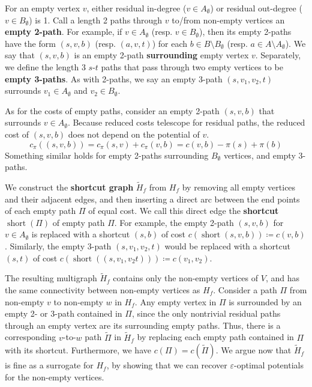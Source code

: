 \documentclass[11pt]{article}
\def\eps{\varepsilon}
\def\short{\operatorname{short}}
\theoremstyle{plain}
\numberwithin{figure}{section}
\def\EMPH#1{\textbf{\boldmath #1}}
\begin{document}
For an empty vertex $v$, either residual in-degree ($v \in A_\emptyset$) or
residual out-degree ($v \in B_\emptyset$) is 1.
Call a length 2 paths through $v$ to/from non-empty vertices an
\EMPH{empty 2-path}.
For example, if $v \in A_\emptyset$ (resp. $v \in B_\emptyset$), then its empty
2-paths have the form $(s, v, b)$ (resp. $(a, v, t)$) for each
$b \in B \setminus B_\emptyset$ (resp. $a \in A \setminus A_\emptyset$).
We say that $(s, v, b)$ is an empty 2-path \EMPH{surrounding} empty vertex $v$.
Separately, we define the length 3 $s$-$t$ paths that pass through two empty
vertices to be \EMPH{empty 3-paths}.
As with 2-paths, we say an empty 3-path $(s, v_1, v_2, t)$ surrounds
$v_1 \in A_\emptyset$ and $v_2 \in B_\emptyset$.

As for the costs of empty paths, consider an empty 2-path $(s, v, b)$ that
surrounds $v \in A_\emptyset$.
Because reduced costs telescope for residual paths, the reduced cost of
$(s, v, b)$ does not depend on the potential of $v$.
\begin{equation*}
	c_\pi((s, v, b)) = c_\pi(s, v) + c_\pi(v, b) = c(v, b) - \pi(s) + \pi(b)
\end{equation*}
Something similar holds for empty 2-paths surrounding $B_\emptyset$ vertices,
and empty 3-paths.

We construct the \EMPH{shortcut graph} $\tilde{H}_f$ from $H_f$ by removing all
empty vertices and their adjacent edges, and then inserting a direct arc
between the end points of each empty path $\Pi$ of equal cost.
We call this direct edge the \EMPH{shortcut} $\short(\Pi)$ of empty path $\Pi$.
For example, the empty 2-path $(s, v, b)$ for $v \in A_\emptyset$ is replaced
with a shortcut $(s, b)$ of cost $c(\short(s, v, b)) \coloneqq c(v, b)$.
Similarly, the empty 3-path $(s, v_1, v_2, t)$ would be replaced with a
shortcut $(s, t)$ of cost $c(\short((s, v_1, v_2 t))) \coloneqq c(v_1, v_2)$.

The resulting multigraph $\tilde{H}_f$ contains only the non-empty vertices of
$V$, and has the same connectivity between non-empty vertices as $H_f$.
Consider a path $\Pi$ from non-empty $v$ to non-empty $w$ in $H_f$.
Any empty vertex in $\Pi$ is surrounded by an empty 2- or 3-path contained
in $\Pi$, since the only nontrivial residual paths through an empty vertex are
its surrounding empty paths.
Thus, there is a corresponding $v$-to-$w$ path $\tilde{\Pi}$ in $\tilde{H}_f$
by replacing each empty path contained in $\Pi$ with its shortcut.
Furthermore, we have $c(\Pi) = c(\tilde{\Pi})$.
We argue now that $\tilde{H}_f$ is fine as a surrogate for $H_f$, by showing
that we can recover $\eps$-optimal potentials for the non-empty vertices.
\end{document}
